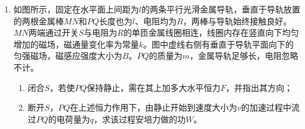 \begin{enumerate}
\item 
{}
如图所示，固定在水平面上间距为$ l $的两条平行光滑金属导轨，垂直于导轨放置的两根金属棒$ MN $和$ PQ $长度也为$ l $、电阻均为$ R $，两棒与导轨始终接触良好。$ MN $两端通过开关$ S $与电阻为$ R $的单匝金属线圈相连，线圈内存在竖直向下均匀增加的磁场，磁通量变化率为常量$ k $。图中虚线右侧有垂直于导轨平面向下的匀强磁场，磁感应强度大小为$ B $。$ PQ $的质量为$ m $，金属导轨足够长，电阻忽略不计。
\begin{enumerate}
\renewcommand{\labelenumi}{\arabic{enumi}.}
\item
闭合$ S $，若使$ PQ $保持静止，需在其上加多大水平恒力$ F $，并指出其方向；
\item 
断开$ S $，$ PQ $在上述恒力作用下，由静止开始到速度大小为$ v $的加速过程中流过$ PQ $的电荷量为$ q $，求该过程安培力做的功$ W $。


\end{enumerate}

\begin{figure}[h!]
\flushright 

\end{figure}








\end{enumerate}
